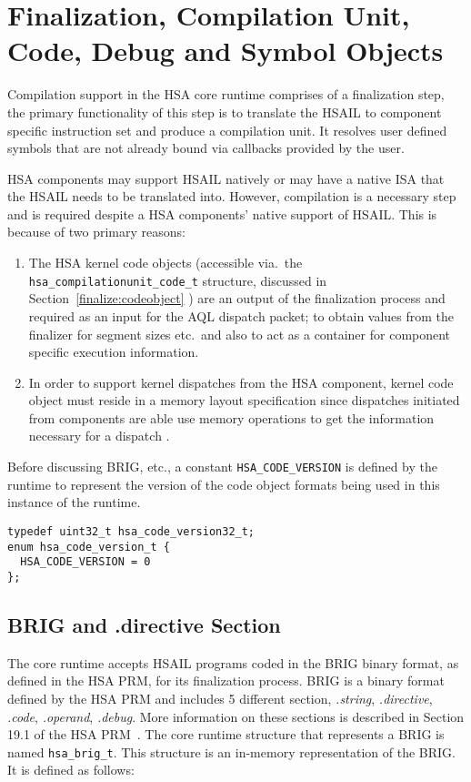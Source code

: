 \hypertarget{finalizer}{}\section{Finalization, Compilation Unit, 
Code, Debug and Symbol Objects}\label{finalizer}

Compilation support in the HSA core runtime comprises of a
finalization step, the primary functionality of this step is to
translate the HSAIL to component specific instruction set and
produce a compilation unit.  It resolves user defined symbols that
are not already bound via callbacks provided by the user.

HSA components may support HSAIL natively or may have a native ISA
that the HSAIL needs to be translated into. However, compilation is a
necessary step and is required despite a HSA components' native support
of HSAIL. This is because of two primary reasons:

\begin{enumerate}
\item  The HSA kernel code objects (accessible via.\ the
\texttt{hsa\_compilationunit\_code\_t} structure, discussed in
Section~\ref{finalize:codeobject} ) are an output of the
finalization process and required as an input for the AQL dispatch
packet; to obtain values from the finalizer for segment sizes etc.\
and also to act as a container for component specific execution
information.  

\item In order to support kernel dispatches from the HSA
component, kernel code object must reside in a memory layout
specification since dispatches initiated from components are able
use memory operations to get the information necessary for a
dispatch . 
\end{enumerate}

Before discussing BRIG, etc., a constant \texttt{HSA\_CODE\_VERSION}
is defined by the runtime to represent the version of the code
object formats being used in this instance of the runtime.

\begin{lstlisting}
typedef uint32_t hsa_code_version32_t;
enum hsa_code_version_t {
  HSA_CODE_VERSION = 0
};
\end{lstlisting}

\subsection{BRIG and .directive Section}
The core runtime accepts H\-S\-A\-I\-L programs coded in the
B\-R\-I\-G binary format, as defined in the HSA PRM, for its
finalization process.  BRIG is a binary format defined by the HSA
PRM and includes 5 different section, \emph{.string},
\emph{.directive}, \emph{.code}, \emph{.operand}, \emph{.debug}.
More information on these sections is described in Section 19.1 of
the HSA PRM~\cite{prm}. The core runtime structure that represents a
BRIG is named \texttt{hsa\_brig\_t}. This structure is an in-memory
representation of the BRIG. It is defined as follows:


